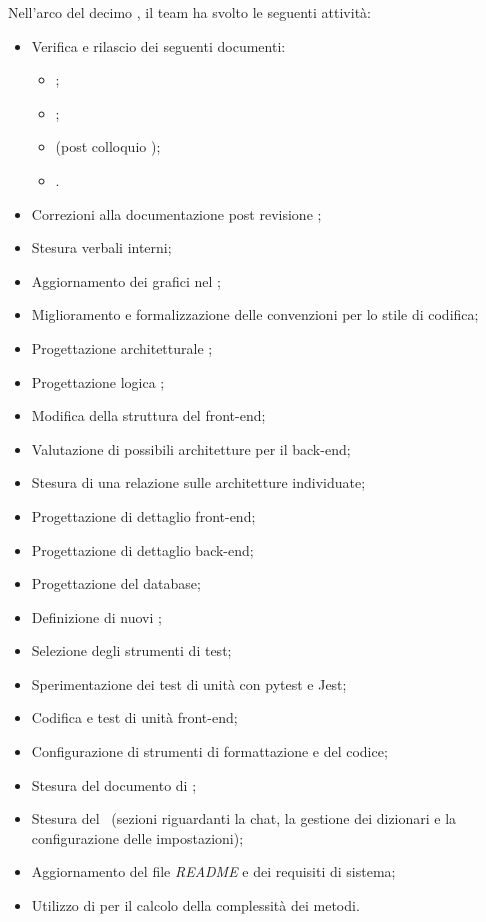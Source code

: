 Nell'arco del decimo , il team ha svolto le seguenti attività:
\begin{itemize}
 \item Verifica e rilascio dei seguenti documenti:
  \begin{itemize}
    \item \NdP;
    \item \PdP;
    \item \AdR{} (post colloquio \RTB);
    \item \PdQ.
  \end{itemize}
  \item Correzioni alla documentazione post revisione ;
  \item Stesura verbali interni;
  \item Aggiornamento dei grafici nel \PdQ;
  \item Miglioramento e formalizzazione delle convenzioni per lo stile di codifica;
  \item Progettazione architetturale ;
  \item Progettazione logica ;
  \item Modifica della struttura del front-end;
  \item Valutazione di possibili architetture per il back-end;
  \item Stesura di una relazione sulle architetture individuate;
  \item Progettazione di dettaglio front-end;
  \item Progettazione di dettaglio back-end;
  \item Progettazione del database;
  \item Definizione di nuovi ;
  \item Selezione degli strumenti di test;
  \item Sperimentazione dei test di unità con pytest e Jest;
  \item Codifica e test di unità front-end;
  \item Configurazione di strumenti di formattazione e  del codice;
  \item Stesura del documento di \ST;
  \item Stesura del \MU\ (sezioni riguardanti la chat, la gestione dei dizionari e la configurazione delle impostazioni);
  \item Aggiornamento del file \textit{README} e dei requisiti di sistema;
  \item Utilizzo di  per il calcolo della complessità dei metodi.
\end{itemize}

